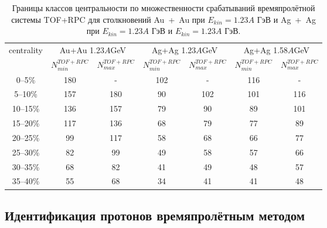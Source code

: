 \begin{table}[]
    \small
    \begin{tabular}{|c|c|c|c|c|c|c|}
    \hline
    \multirow{2}{*}{centrality} & \multicolumn{2}{c|}{Au+Au 1.23$A$GeV} & \multicolumn{2}{c|}{Ag+Ag 1.23$A$GeV} & \multicolumn{2}{c|}{Ag+Ag 1.58$A$GeV} \\ \cline{2-7} 
                                & $N_{min}^{TOF+RPC}$     & $N_{max}^{TOF+RPC}$     & $N_{min}^{TOF+RPC}$     & $N_{max}^{TOF+RPC}$     & $N_{min}^{TOF+RPC}$     & $N_{max}^{TOF+RPC}$     \\ \hline
    0--5\%                      & 180         & -           & 102         & -           & 116         & -           \\ \hline
    5--10\%                     & 157         & 180         & 90          & 102         & 101         & 116         \\ \hline
    10--15\%                    & 136         & 157         & 79          & 90          & 89          & 101         \\ \hline
    15--20\%                    & 117         & 136         & 68          & 79          & 77          & 89          \\ \hline
    20--25\%                    & 99          & 117         & 58          & 68          & 66          & 77          \\ \hline
    25--30\%                    & 82          & 99          & 49          & 58          & 57          & 66          \\ \hline
    30--35\%                    & 68          & 82          & 41          & 49          & 48          & 57          \\ \hline
    35--40\%                    & 55          & 68          & 34          & 41          & 41          & 48          \\ \hline
    \end{tabular}
\caption{Границы классов центральности по множественности срабатываний времяпролётной системы TOF+RPC для столкновений Au~+~Au при $E_{kin}=1.23A$ ГэВ и Ag~+~Ag при $E_{kin}=1.23A$ ГэВ и $E_{kin}=1.23A$ ГэВ. }
\end{table}

\subsection{Идентификация протонов времяпролётным методом}

